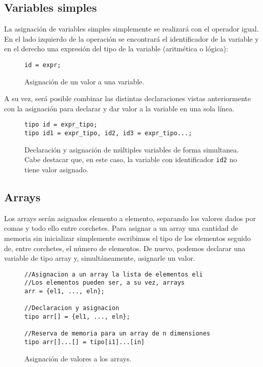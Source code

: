 \subsection*{Variables simples}
La asignación de variables simples simplemente se realizará con el operador
igual. En el lado izquierdo de la operación se encontrará el identificador de la
variable y en el derecho una expresión del tipo de la variable (aritmética o
lógica):
\begin{figure}[H]
    \centering
    \begin{lstlisting}
id = expr;
    \end{lstlisting}
    \caption{Asignación de un valor a una variable.}
\end{figure}
A su vez, será posible combinar las distintas declaraciones vistas anteriormente
con la asignación para declarar y dar valor a la variable en una sola línea.
\begin{figure}[H]
    \centering
    \begin{lstlisting}
tipo id = expr_tipo;
tipo id1 = expr_tipo, id2, id3 = expr_tipo...;
    \end{lstlisting}
    \caption{Declaración y asignación de múltiples variables de forma
    simultanea. Cabe destacar que, en este caso, la variable con identificador \lstinline{id2}
    no tiene valor asignado.}
\end{figure}

\subsection*{Arrays}
Los arrays serán asignados elemento a elemento, separando los valores dados por
comas y todo ello entre corchetes. Para asignar a un array una cantidad de
memoria sin inicializar simplemente escribimos el tipo de los elementos seguido
de, entre corchetes, el número de elementos. De nuevo, podemos declarar una
variable de tipo array y, simultáneamente, asignarle un valor.
\begin{figure}[H]
    \centering
    \begin{lstlisting}
//Asignacion a un array la lista de elementos eli
//Los elementos pueden ser, a su vez, arrays
arr = {el1, ..., eln};

//Declaracion y asignacion
tipo arr[] = {el1, ..., eln};

//Reserva de memoria para un array de n dimensiones
tipo arr[]...[] = tipo[i1]...[in] 
    \end{lstlisting}
    \caption{Asignación de valores a los arrays.}
\end{figure}

